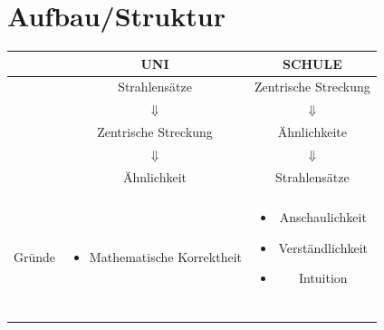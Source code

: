 \documentclass[a4paper,headlines=4, footlines=1]{scrartcl}
\begin{document}
\section{Aufbau/Struktur}
\begin{table}[!h]
	\centering
	\begin{tabular}{c|c|c}
		& UNI & SCHULE\\ \hline
		& Strahlensätze & Zentrische Streckung\\
		& $\Downarrow$ & $\Downarrow$ \\
		& Zentrische Streckung & Ähnlichkeite\\
		& $\Downarrow$ & $\Downarrow$ \\
		& Ähnlichkeit & Strahlensätze\\
		&&\\ \hline
		\multirow{6}{1.8cm}{Gründe} & \multirow{6}{5cm}{\begin{itemize}
				\item  Mathematische Korrektheit
		\end{itemize}}  & \multirow{1}{4cm}{\begin{itemize}
				\item Anschaulichkeit
				\item Verständlichkeit
				\item Intuition
		\end{itemize}}\\
		& &\\
		& &\\
		& &\\
		& &	
	\end{tabular}
\end{table}
\end{document}
